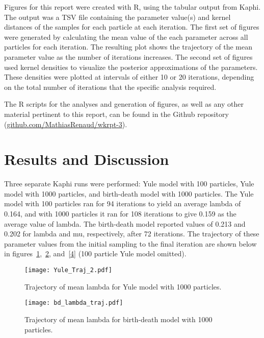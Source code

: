 \documentclass[12pt]{article}
\begin{document}
	Figures for this report were created with R, using the tabular output from Kaphi. The output was a TSV file containing the parameter value(s) and kernel distances of the samples for each particle at each iteration. The first set of figures were generated by calculating the mean value of the each parameter across all particles for each iteration. The resulting plot shows the trajectory of the mean parameter value as the number of iterations increases. The second set of figures used kernel densities to visualize the posterior approximations of the parameters. These densities were plotted at intervals of either 10 or 20 iterations, depending on the total number of iterations that the specific analysis required. 

	The R scripts for the analyses and generation of figures, as well as any other material pertinent to this report, can be found in the Github repository (\url{github.com/MathiasRenaud/wkrpt-3}).


\section{ Results and Discussion}

	Three separate Kaphi runs were performed: Yule model with 100 particles, Yule model with 1000 particles, and birth-death model with 1000 particles. The Yule model with 100 particles ran for 94 iterations to yield an average lambda of 0.164, and with 1000 particles it ran for 108 iterations to give 0.159 as the average value of lambda. The birth-death model reported values of 0.213 and 0.202 for lambda and mu, respectively, after 72 iterations. The trajectory of these parameter values from the initial sampling to the final iteration are shown below in figures~\ref{2},~\ref{3}, and~\ref{4} (100 particle Yule model omitted). 

\begin{figure}[t]
\texttt{[image: Yule\_Traj\_2.pdf]}
\caption[Trajectory of lambda (Yule)]{Trajectory of mean lambda for Yule model with 1000 particles.}
\centering
\label{2}
\end{figure}

\begin{figure}[ht]
\texttt{[image: bd\_lambda\_traj.pdf]}
\caption[Trajectory of lambda (birth-death)]{Trajectory of mean lambda for birth-death model with 1000 particles.}
\centering
\label{3}
\end{figure}
\end{document}
